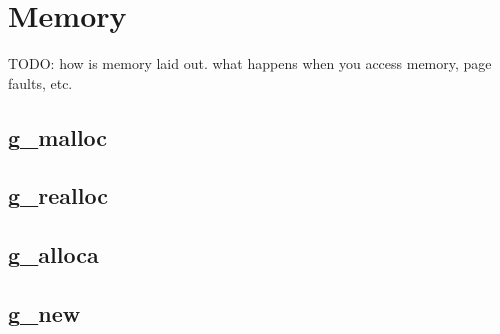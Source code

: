 \chapter{Memory}

TODO: how is memory laid out. what happens when you access
memory, page faults, etc.

\section{g\_malloc}
\section{g\_realloc}
\section{g\_alloca}
\section{g\_new}
